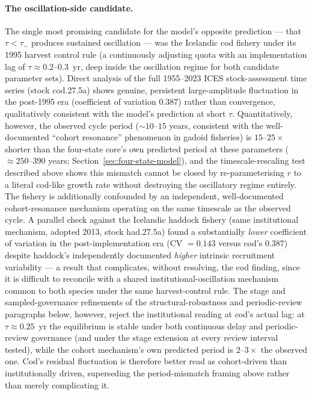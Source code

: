 \documentclass[twocolumn,10pt]{article}
\begin{document}
\paragraph{The oscillation-side candidate.} The single most promising candidate for the model's opposite prediction --- that $\tau<\tau_-$ produces sustained oscillation --- was the Icelandic cod fishery under its 1995 harvest control rule (a continuously adjusting quota with an implementation lag of $\tau\approx0.2$--$0.3$~yr, deep inside the oscillation regime for both candidate parameter sets). Direct analysis of the full 1955--2023 ICES stock-assessment time series (stock cod.27.5a) shows genuine, persistent large-amplitude fluctuation in the post-1995 era (coefficient of variation $0.387$) rather than convergence, qualitatively consistent with the model's prediction at short $\tau$. Quantitatively, however, the observed cycle period ($\sim10$--$15$ years, consistent with the well-documented ``cohort resonance'' phenomenon in gadoid fisheries) is $15$--$25\times$ shorter than the four-state core's own predicted period at these parameters ($\approx250$--$390$ years; Section~\ref{sec:four-state-model}), and the timescale-rescaling test described above shows this mismatch cannot be closed by re-parameterising $r$ to a literal cod-like growth rate without destroying the oscillatory regime entirely. The fishery is additionally confounded by an independent, well-documented cohort-resonance mechanism operating on the same timescale as the observed cycle. A parallel check against the Icelandic haddock fishery (same institutional mechanism, adopted 2013, stock had.27.5a) found a substantially \emph{lower} coefficient of variation in the post-implementation era (CV $=0.143$ versus cod's $0.387$) despite haddock's independently documented \emph{higher} intrinsic recruitment variability --- a result that complicates, without resolving, the cod finding, since it is difficult to reconcile with a shared institutional-oscillation mechanism common to both species under the same harvest-control rule. The stage and sampled-governance refinements of the structural-robustness and periodic-review paragraphs below, however, reject the institutional reading at cod's actual lag: at $\tau\approx0.25$~yr the equilibrium is stable under both continuous delay and periodic-review governance (and under the stage extension at every review interval tested), while the cohort mechanism's own predicted period is $2$--$3\times$ the observed one. Cod's residual fluctuation is therefore better read as cohort-driven than institutionally driven, superseding the period-mismatch framing above rather than merely complicating it.
\end{document}
